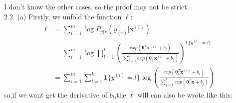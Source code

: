 \documentclass[a4paper]{article}
\begin{document}
I don't know the other cases, so the proof may not be strict.
$$$$ 
2.2. (a) Firstly, we unfold the function $\ell$:
  \begin{equation*}
    \begin{aligned}
\ell &= \sum _{i=1}^m \log {P_{y|\mathbf{x}}(y_{(i)}|\mathbf{x}^{(i)})}
\\
 &= \sum _{i=1}^m \log \prod _{l=1} ^k \left(
\frac{exp(\mathbf{\theta}_l^T\mathbf{x}^{(i)}+b_l)}{\sum_{j=1}^k exp(\mathbf{\theta}_j^T\mathbf{x}^{(i)}+b_j)} 
 \right)^{\mathbf{1}\{y^{(i)} = l\}} \\  
    &= \sum_{i=1}^m \sum_{l=1}^k \mathbf{1}\{ y^{(i)}=l\}\log\left( \frac{exp(\mathbf{\theta}_l^T\mathbf{x}^{(i)}+b_l)}{\sum_{j=1}^k exp(\mathbf{\theta}_j^T\mathbf{x}+b_j)} \right)
      \end{aligned}
  \end{equation*}
so,if we want get the derivative of $b_l$,the $\ell$ will can also be wrote like this:
\end{document}
